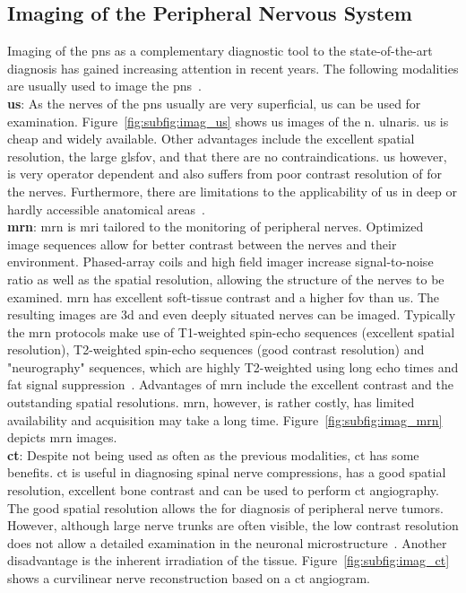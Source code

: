 \subsection{Imaging of the Peripheral Nervous System}
Imaging of the \gls{pns} as a complementary diagnostic tool to the state-of-the-art diagnosis has gained increasing attention in recent years. The following modalities are usually used to image the \gls{pns}~\cite{Ohana2014CurrentSystem}.\\

\textbf{\gls{us}}: As the nerves of the \gls{pns} usually are very superficial, \gls{us} can be used for examination. Figure~\ref{fig:subfig:imag_us} shows \gls{us} images of the \gls{n.} ulnaris. \gls{us} is cheap and widely available. Other advantages include the excellent spatial resolution, the large gls{fov}, and that there are no contraindications. \gls{us} however, is very operator dependent and also suffers from poor contrast resolution of for the nerves. Furthermore, there are limitations to the applicability of \gls{us} in deep or hardly accessible anatomical areas~\cite{Ohana2014CurrentSystem}.\\

\textbf{\gls{mrn}}: \gls{mrn} is \gls{mri} tailored to the monitoring of peripheral nerves. Optimized image sequences allow for better contrast between the nerves and their environment. Phased-array coils and high field imager increase signal-to-noise ratio as well as the spatial resolution, allowing the structure of the nerves to be examined. \gls{mrn} has excellent soft-tissue contrast and a higher \gls{fov} than \gls{us}. The resulting images are \gls{3d} and even deeply situated nerves can be imaged. Typically the \gls{mrn} protocols make use of T1-weighted spin-echo sequences (excellent spatial resolution), T2-weighted spin-echo sequences (good contrast resolution) and "neurography" sequences, which are highly T2-weighted using long echo times and fat signal suppression~\cite{Ohana2014CurrentSystem}. Advantages of \gls{mrn} include the excellent contrast and the outstanding spatial resolutions. \gls{mrn}, however, is rather costly, has limited availability and acquisition may take a long time. Figure~\ref{fig:subfig:imag_mrn} depicts \gls{mrn} images.\\

\textbf{\gls{ct}}: Despite not being used as often as the previous modalities, \gls{ct} has some benefits. \gls{ct} is useful in diagnosing spinal nerve compressions, has a good spatial resolution, excellent bone contrast and can be used to perform \gls{ct} angiography. The good spatial resolution allows the for diagnosis of peripheral nerve tumors. However, although large nerve trunks are often visible, the low contrast resolution does not allow a detailed examination in the neuronal microstructure~\cite{Ohana2014CurrentSystem}. Another disadvantage is the inherent irradiation of the tissue. Figure~\ref{fig:subfig:imag_ct} shows a curvilinear nerve reconstruction based on a \gls{ct} angiogram.\\



